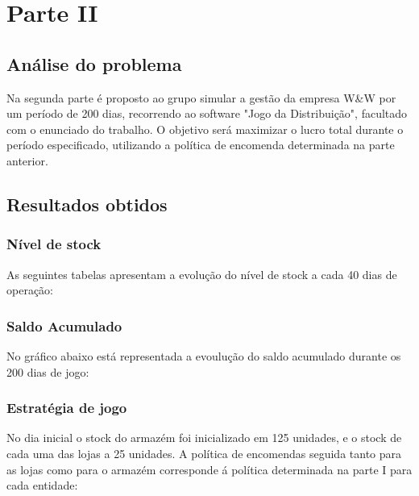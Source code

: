 \chapter{Parte II}

\section{Análise do problema}

Na segunda parte é proposto ao grupo simular a gestão da empresa W\&W por um período de 200 dias, recorrendo ao software "Jogo da Distribuição", facultado com o enunciado do trabalho. O objetivo será maximizar o lucro total durante o período especificado, utilizando a política de encomenda determinada na parte anterior.

\section{Resultados obtidos}

\subsection{Nível de stock}

As seguintes tabelas apresentam a evolução do nível de stock a cada 40 dias de operação: 










\subsection{Saldo Acumulado}

No gráfico abaixo está representada a evoulução do saldo acumulado durante os 200 dias de jogo:



\newpage

\subsection{Estratégia de jogo}

No dia inicial o stock do armazém foi inicializado em 125 unidades, e o stock de cada uma das lojas a 25 unidades. A política de encomendas seguida tanto para as lojas como para o armazém corresponde á política determinada na parte I para cada entidade:

